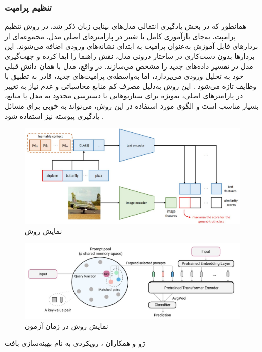 \subsubsection{تنظیم پرامپت}
همانطور که در بخش یادگیری انتقالی مدل‌های بینایی-زبان ذکر شد، در روش تنظیم پرامپت، به‌جای بازآموزی کامل یا تغییر در پارامترهای اصلی مدل، مجموعه‌ای از بردارهای قابل‌ آموزش به‌عنوان پرامپت به ابتدای نشانه‌های ورودی
اضافه می‌شوند. این بردارها بدون دست‌کاری در ساختار درونی مدل، نقش راهنما را ایفا کرده و جهت‌گیری مدل در تفسیر داده‌های جدید را مشخص می‌سازند. در واقع، مدل با همان دانش قبلی خود به تحلیل ورودی می‌پردازد، اما به‌واسطه‌ی پرامپت‌های جدید، قادر به تطبیق با وظایف تازه می‌شود \cite{llm_continual}. این روش به‌دلیل مصرف کم منابع محاسباتی و عدم نیاز به تغییر در پارامترهای اصلی، به‌ویژه برای سناریوهایی با دسترسی محدود به مدل یا منابع، بسیار مناسب است و الگوی مورد استفاده در این روش، می‌تواند به خوبی برای مسائل یادگیری پیوسته نیز استفاده شود
\cite{llm_continual}.
\begin{figure}
	\centering\includegraphics[scale=.55]{Images/Chapter2/CoOp.jpg}
	\caption[]{ نمایش روش 
		\protect\cite{CoOp}}
	\label{fig.23}
\end{figure}
\begin{figure}
	\centering\includegraphics[scale=.65]{Images/Chapter2/l2p.jpg}
	\caption[]{ نمایش روش 
		در زمان آزمون
		\protect\cite{l2p}}
	\label{fig.24}
\end{figure}
ژو و همکاران 
\cite{CoOp}،
رویکردی به نام بهینه‌سازی بافت 
